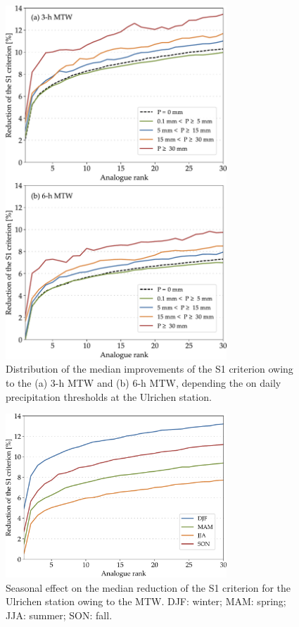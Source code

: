 \documentclass[hess, manuscript]{copernicus}
\begin{document}
	\begin{figure}[htb]
		\begin{center}
			\includegraphics[width=8.3cm]{fig05.pdf}
		\end{center}
		\caption{Distribution of the median improvements of the S1 criterion owing to the (a) 3-h MTW and (b) 6-h MTW, depending the on daily precipitation thresholds at the Ulrichen station.}
		\label{fig:changes_S1_precip_threshold}
	\end{figure}
	
	\begin{figure}[htb]
		\begin{center}
			\includegraphics[width=8.3cm]{fig06.pdf}
		\end{center}
		\caption{Seasonal effect on the median reduction of the S1 criterion for the Ulrichen station owing to the MTW. DJF: winter; MAM: spring; JJA: summer; SON: fall.}
		\label{fig:changes_S1_seasons}
	\end{figure}
	
\end{document}
